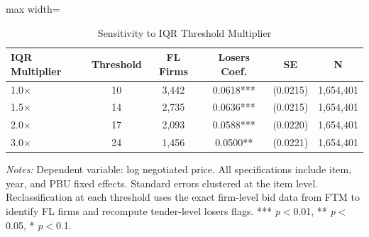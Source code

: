 \begin{table}[htbp]
\centering
\caption{Sensitivity to IQR Threshold Multiplier}
\label{tab:threshold_robustness}
\begin{adjustbox}{max width=\textwidth}
\begin{threeparttable}
\small
\begin{tabular}{lccccc}
\toprule
IQR Multiplier & Threshold & FL Firms & Losers Coef. & SE & N \\
\midrule
1.0$\times$ & 10 & 3,442 & 0.0618*** & (0.0215) & 1,654,401 \\
1.5$\times$ & 14 & 2,735 & 0.0636*** & (0.0215) & 1,654,401 \\
2.0$\times$ & 17 & 2,093 & 0.0588*** & (0.0220) & 1,654,401 \\
3.0$\times$ & 24 & 1,456 & 0.0500** & (0.0221) & 1,654,401 \\
\bottomrule
\end{tabular}
\begin{tablenotes}
\small
\item \textit{Notes:} Dependent variable: log negotiated price.
All specifications include item, year, and PBU fixed effects.
Standard errors clustered at the item level.
Reclassification at each threshold uses the exact firm-level bid data from FTM to identify FL firms and recompute tender-level losers flags.
*** \textit{p}$<$0.01, ** \textit{p}$<$0.05, * \textit{p}$<$0.1.
\end{tablenotes}
\end{threeparttable}
\end{adjustbox}
\end{table}
